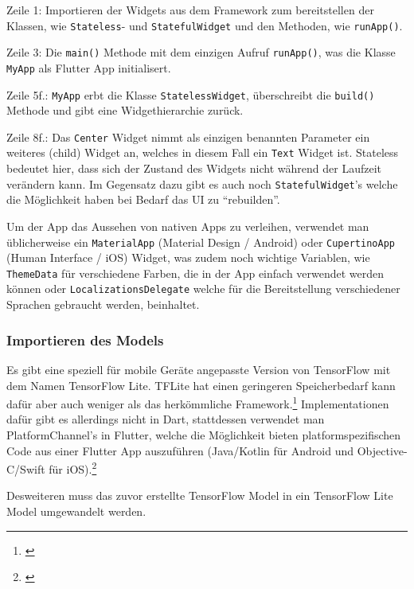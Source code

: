 Zeile 1: Importieren der Widgets aus dem Framework zum bereitstellen der Klassen, wie \texttt{Stateless}- und \texttt{StatefulWidget} und den Methoden, wie \texttt{runApp()}.

Zeile 3: Die \texttt{main()} Methode mit dem einzigen Aufruf \texttt{runApp()}, was die Klasse \texttt{MyApp} als Flutter App initialisert.

Zeile 5f.: \texttt{MyApp} erbt die Klasse \texttt{StatelessWidget}, überschreibt die \texttt{build()} Methode und gibt eine Widgethierarchie zurück.

Zeile 8f.: Das \texttt{Center} Widget nimmt als einzigen benannten Parameter ein weiteres (child) Widget an, welches in diesem Fall ein \texttt{Text} Widget ist. Stateless bedeutet hier, dass sich der Zustand des Widgets nicht während der Laufzeit verändern kann. Im Gegensatz dazu gibt es auch noch \texttt{StatefulWidget}'s welche die Möglichkeit haben bei Bedarf das UI zu "`rebuilden"'.

Um der App das Aussehen von nativen Apps zu verleihen, verwendet man üblicherweise ein \texttt{MaterialApp} (Material Design / Android) oder \texttt{CupertinoApp} (Human Interface / iOS) Widget, was zudem noch wichtige Variablen, wie \texttt{ThemeData} für verschiedene Farben, die in der App einfach verwendet werden können oder \texttt{LocalizationsDelegate} welche für die Bereitstellung verschiedener Sprachen gebraucht werden, beinhaltet.

\subsubsection{Importieren des Models}

Es gibt eine speziell für mobile Geräte angepasste Version von TensorFlow mit dem Namen TensorFlow Lite. TFLite hat einen geringeren Speicherbedarf kann dafür aber auch weniger als das herkömmliche Framework.\footnote{\cite{tflite}} Implementationen dafür gibt es allerdings nicht in Dart, stattdessen verwendet man PlatformChannel's in Flutter, welche die Möglichkeit bieten platformspezifischen Code aus einer Flutter App auszuführen (Java/Kotlin für Android und Objective-C/Swift für iOS).\footnote{\cite{flutterplatformcode}}

Desweiteren muss das zuvor erstellte TensorFlow Model in ein TensorFlow Lite Model umgewandelt werden.

